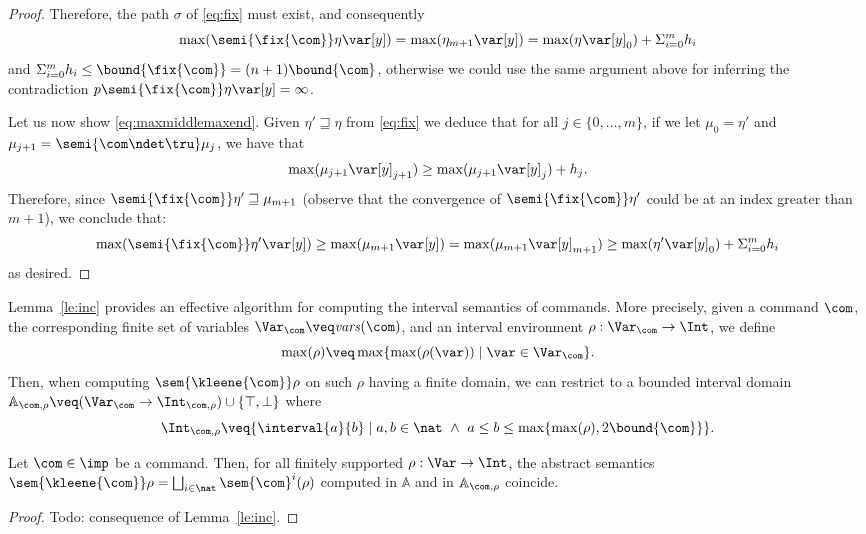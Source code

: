 \begin{proof}
  \noindent
  Therefore, the path \(\sigma\) of \eqref{eq:fix} must exist, and consequently
  \[\max(\semi{\fix{\com}} \eta \var[y]) = \max(\eta_{m+1} \var[y]) = \max(\eta  \var[y]_0) + \Sigma_{i=0}^m h_i\]
  and
  \(\Sigma_{i=0}^m h_i \leq \bound{\fix{\com}}=(n+1)\bound{\com}\),
  otherwise we could use the same argument above for inferring the
  contradiction \(p\semi{\fix{\com}} \eta \var[y] = \infty\).

  \medskip

  Let us now show \eqref{eq:maxmiddlemaxend}. Given
  \(\eta' \sqsupseteq \eta\) from \eqref{eq:fix} we deduce that for
  all \(j \in \{ 0, \ldots, m\}\), if we let \(\mu_0 = \eta'\) and
  \(\mu_{j+1} = \semi{\com \ndet \tru} \mu_j\), we have that
  \[
  \max(\mu_{j+1} \var[y]_{j+1}) \geq \max(\mu_{j+1} \var[y]_{j}) + h_j.
  \]
  Therefore, since \(\semi{\fix{\com}} \eta' \sqsupseteq \mu_{m+1}\)
  (observe that the convergence of \(\semi{\fix{\com}} \eta' \) could
  be at an index greater than \(m+1\)), we conclude that:
  \[\max(\semi{\fix{\com}} \eta' \var[y]) \geq \max(\mu_{m+1}
  \var[y]) = \max(\mu_{m+1} \var[y]_{m+1}) \geq \max(\eta' \var[y]_0)
  + \Sigma_{i=0}^m h_i\] as desired.
\end{proof}

Lemma~\ref{le:inc} provides an effective algorithm for computing the interval
semantics of commands. More precisely, given  a command \(\com\), the corresponding
finite set of variables \(\Var_{\com} \veq \mathit{vars}(\com)\), and an interval environment
\(\rho : \Var_{\com}  \to \Int\),  we define
\[\max(\rho) \veq \max \{ \max(\rho(\var)) \mid \var \in \Var_{\com}  \}.\]
%
Then, when computing \(\sem{\kleene{\com}} \rho\) on such \(\rho\) having a finite domain, we can
restrict to a bounded interval domain
\(\mathbb{A}_{\com,\rho} \veq (\Var_{\com} \to \Int_{\com,\rho}) \cup \{ \top, \bot \}\) where
\[
\Int_{\com,\rho} \veq  \{ \interval{a}{b} \mid a, b \in \nat\ \land\ a \leq b
\leq \max\{\max(\rho), 2 \bound{\com}\}\}.
\]


\begin{lemma}
  Let \(\com\in \imp\) be a command. Then, for all finitely supported
  \(\rho : \Var \to \Int\), the abstract semantics
  \(\sem{\kleene{\com}} \rho
  = \textstyle \bigsqcup_{i \in \nat} \sem{\com}^i (\rho)\)
  computed in \(\mathbb{A}\) and in \(\mathbb{A}_{\com,\rho}\) coincide.
\end{lemma}

\begin{proof}
  Todo: consequence of Lemma~\ref{le:inc}.
\end{proof}
